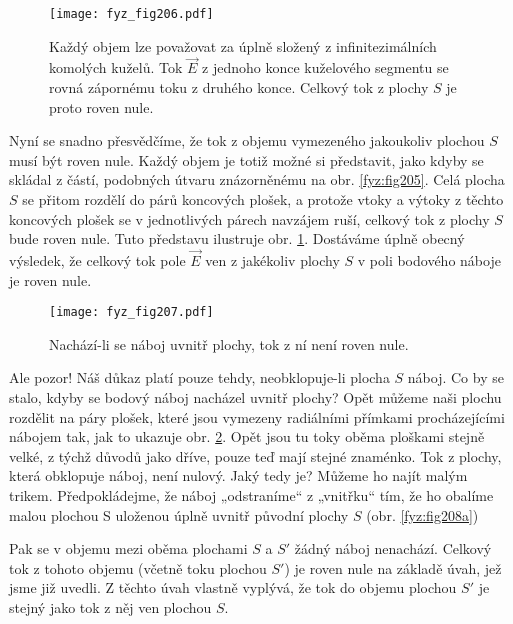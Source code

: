 {    \begin{figure}[ht!]
      \centering
      \texttt{[image: fyz\_fig206.pdf]}
      \caption{Každý objem lze považovat za úplně složený z infinitezimálních komolých kuželů. Tok 
               \(\vec{E}\) z jednoho konce kuželového segmentu se rovná zápornému toku z druhého 
               konce. Celkový tok z plochy \(S\) je proto roven nule.}
      \label{fyz:fig206} 
    \end{figure}

    Nyní se snadno přesvědčíme, že tok z objemu vymezeného jakoukoliv plochou \(S\) musí být roven 
    nule. Každý objem je totiž možné si představit, jako kdyby se skládal z částí, podobných útvaru 
    znázorněnému na obr. \ref{fyz:fig205}. Celá plocha \(S\) se přitom rozdělí do párů 
    koncových plošek, a protože vtoky a výtoky z těchto koncových plošek se v jednotlivých párech 
    navzájem ruší, celkový tok z plochy \(S\) bude roven nule. Tuto představu ilustruje obr. 
    \ref{fyz:fig206}. Dostáváme úplně obecný výsledek, že celkový tok pole \(\vec{E}\) ven 
    z jakékoliv plochy \(S\) v poli bodového náboje je roven nule. 

    \begin{figure}[ht!]
      \centering                  
      \texttt{[image: fyz\_fig207.pdf]}
      \caption{Nachází-li se náboj uvnitř plochy, tok z ní není roven nule.}
      \label{fyz:fig207}  
    \end{figure} 
                  
    Ale pozor! Náš důkaz platí pouze tehdy, neobklopuje-li plocha \(S\) náboj. Co by se stalo, 
    kdyby se bodový náboj nacházel uvnitř plochy? Opět můžeme naši plochu rozdělit na páry plošek, 
    které jsou vymezeny radiálními přímkami procházejícími nábojem tak, jak to ukazuje obr. 
    \ref{fyz:fig207}. Opět jsou tu toky  oběma ploškami stejně velké, z týchž důvodů jako dříve, 
    pouze teď mají stejné znaménko. Tok z plochy, která obklopuje náboj, není nulový. Jaký tedy je? 
    Můžeme ho najít malým trikem. Předpokládejme, že náboj „odstraníme“ z „vnitřku“ tím, že ho 
    obalíme malou plochou S uloženou úplně uvnitř původní plochy \(S\) (obr. \ref{fyz:fig208a})
   
    Pak se v objemu mezi oběma plochami \(S\) a \(S'\) žádný náboj nenachází. Celkový tok z tohoto 
    objemu (včetně toku plochou \(S'\)) je roven nule na základě úvah, jež jsme již uvedli. Z 
    těchto úvah vlastně vyplývá, že tok do objemu plochou \(S'\) je stejný jako tok z něj ven 
    plochou \(S\).

}
